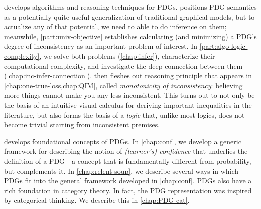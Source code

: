 { develops algorithms and reasoning techniques for PDGs.
 positions PDG semantics as a potentially quite useful generalization of traditional graphical models, but to actualize any of that potential, we need to able to do inference on them;
meanwhile, 
\cref{part:univ-objective} establishes calculating (and minimizing) a PDG's degree of inconsistency as an important problem of interest. 
In \cref{part:algo-logic-complexity}, we solve both problems (\cref{chap:infer}), characterize their computational complexity, and investigate the deep connection between them (\cref{chap:inc-infer-connection}). 
 then fleshes out 
    reasoning principle that appears in
    \cref{chap:one-true-loss,chap:QIM},
    called \emph{monotonicity of inconsistency}: 
    believing more things cannot make you any less inconsistent. 
This turns out to not only be the basis of an intuitive visual calculus for deriving important inequalities in the literature, but also forms the basis of a \emph{logic} that, unlike most logics, does not become trivial starting from inconsistent premises.


 develops foundational concepts of PDGs. 
In \cref{chap:conf}, we develop a generic framework for describing the notion of \emph{(learner's) confidence} that underlies the definition of a PDG---a concept that is fundamentally different from probability, but complements it.
In \cref{chap:relent-soup}, we describe several ways in which PDGs fit into the general framework developed in \cref{chap:conf}.
PDGs also have a rich foundation in category theory.
In fact, the PDG representation was inspired by categorical thinking. 
We describe this in \cref{chap:PDG-cat}.
%
}
